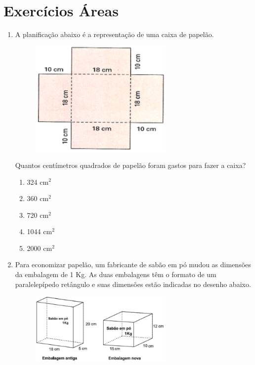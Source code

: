 \documentclass[twocolumn,oneside,a4paper,12.0pt]{article}
\begin{document}
\section*{Exercícios Áreas}
\begin{enumerate}
\item A planificação abaixo é a representação de uma caixa de papelão.

	\begin{figure}[!htb]
	\center
	\includegraphics[width=7cm]{Extras/a1.png}
	\end{figure}

Quantos centímetros quadrados de papelão foram gastos para fazer a caixa?
	
	\begin{enumerate}
	\item 324 cm$^2$
	\item 360 cm$^2$
	\item 720 cm$^2$ 
	\item 1044 cm$^2$ 
	\item 2000 cm$^2$
	\end{enumerate}

\item Para economizar papelão, um fabricante de sabão em pó mudou as dimensões da embalagem de 1 Kg. As duas embalagens têm o formato de um paralelepípedo retângulo e suas dimensões estão indicadas no desenho abaixo.

	\begin{figure}[!htb]
	\center
	\includegraphics[width=7cm]{Extras/a2.png}
	\end{figure}


\end{enumerate}
\end{document}
